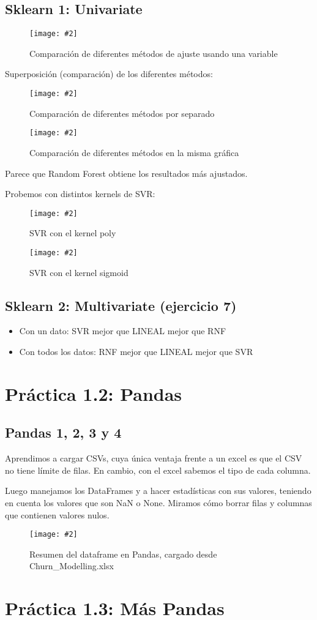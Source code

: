 \documentclass[
12pt, 
spanish, 
singlespacing,
headsepline
]{article}
\newcommand{\image}[2]{
\begin{figure}[H]
	\caption{#1}
	\centering
	\texttt{[image: \#2]}
\end{figure}
}
\begin{document}
\subsection{Sklearn 1: Univariate}

\image{Comparación de diferentes métodos de ajuste usando una variable}{Figure_3.png}

Superposición (comparación) de los diferentes métodos:
\image{Comparación de diferentes métodos por separado}{Figure_4-1.png}

\image{Comparación de diferentes métodos en la misma gráfica}{Figure_4-2.png}

Parece que Random Forest obtiene los resultados más ajustados.

Probemos con distintos kernels de SVR:

\image{SVR con el kernel poly}{Figure_5-poly.png}
\image{SVR con el kernel sigmoid}{Figure_5-sigmoid.png}

\subsection{Sklearn 2: Multivariate (ejercicio 7)}
\begin{itemize}
\item Con un dato: SVR mejor que LINEAL mejor que RNF
\item Con todos los datos: RNF mejor que LINEAL mejor que SVR	
\end{itemize}

\section{Práctica 1.2: Pandas}
\subsection{Pandas 1, 2, 3 y 4}
Aprendimos a cargar CSVs, cuya única ventaja frente a un excel es que el CSV no tiene límite de filas. En cambio, con el excel sabemos el tipo de cada columna.

Luego manejamos los DataFrames y a hacer estadísticas con sus valores, teniendo en cuenta los valores que son NaN o None. Miramos cómo borrar filas y columnas que contienen valores nulos.

\image{Resumen del dataframe en Pandas, cargado desde Churn\string_Modelling.xlsx}{Figure_6.png}

\section{Práctica 1.3: Más Pandas}
\end{document}
